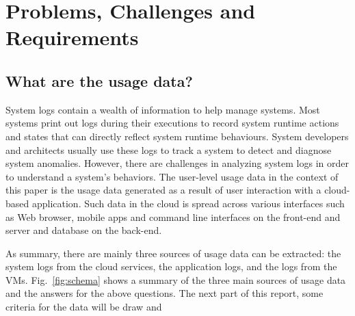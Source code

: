 \section{Problems, Challenges and Requirements}

\subsection{What are the usage data?}

System logs contain a wealth of information to help manage systems. Most systems print out  logs during their executions to record system runtime actions and states that can directly reflect system runtime behaviours. System developers and architects usually use these logs to track a system to detect and diagnose system anomalies. However, there are challenges in analyzing system logs in order to understand a system’s behaviors. 
The user-level usage data in the context of this paper is the usage data generated as a result of user interaction with a cloud-based application. Such data in the cloud is spread across various interfaces such as Web browser, mobile apps and command line interfaces on the front-end and server and database on the back-end.  

As summary, there are mainly three sources of usage data can be extracted: the system logs from the cloud services, the application logs, and the logs from the VMs. Fig.~\ref{fig:schema} shows a summary of the three main sources of usage data and the answers for the above questions. The next part of this report, some criteria for the data will be draw and 


